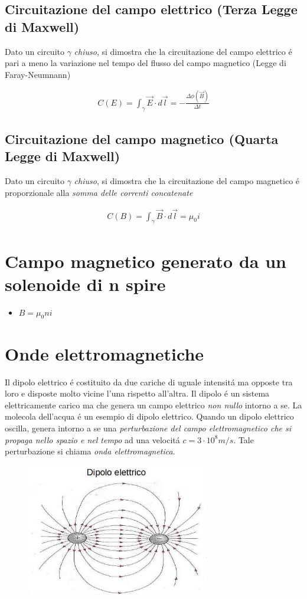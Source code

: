 \documentclass[17pt]{article}
\begin{document}
\subsection{Circuitazione del campo elettrico (Terza Legge di Maxwell)}

Dato un circuito $\gamma$ \emph{chiuso}, si dimostra che la circuitazione del campo elettrico \'e pari a meno la variazione nel tempo del flusso del campo magnetico (Legge di Faray-Neumnann)


\begin{eqnarray}
	C(E)= \int_{\gamma}\vec{E}\cdot d\vec{l} = -\frac{\Delta \phi(\vec{B})}{\Delta t}
\end{eqnarray}

\subsection{Circuitazione del campo magnetico (Quarta Legge di Maxwell)}

Dato un circuito $\gamma$ \emph{chiuso}, si dimostra che la circuitazione del campo magnetico \'e proporzionale alla \emph{somma delle correnti concatenate}

\begin{eqnarray}
	C(B)= \int_{\gamma}\vec{B}\cdot d\vec{l} = \mu_0 i
\end{eqnarray}



\section{Campo magnetico generato da un solenoide di n spire}
\begin{itemize}
	\item $B = \mu_0 ni$
\end{itemize}






\section{Onde elettromagnetiche}

Il dipolo elettrico \'e costituito da due cariche di uguale intensit\'a ma opposte tra loro e disposte molto vicine l'una rispetto all'altra. Il dipolo \'e un sistema elettricamente carico ma che genera un campo elettrico \emph{non nullo} intorno a se. La molecola dell'acqua \'e un esempio di dipolo elettrico. Quando un dipolo elettrico oscilla, genera intorno a se una \emph{perturbazione del campo elettromagnetico che si propaga nello spazio e nel tempo} ad una velocit\'a $c = 3\cdot 10^{8}m/s$. Tale perturbazione si chiama \emph{onda elettromagnetica}.

\begin{figure}[th]
\includegraphics[width=8cm]{dipoloElettrico.jpg}
\centering
\end{figure}
\end{document}
